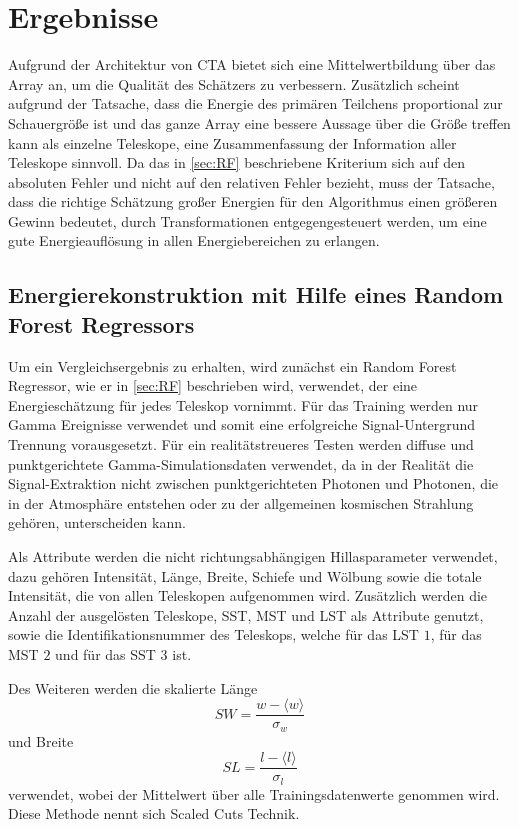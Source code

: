 \chapter{Ergebnisse}
Aufgrund der Architektur von CTA bietet sich eine Mittelwertbildung über das Array an, um die Qualität des Schätzers zu verbessern.
Zusätzlich scheint aufgrund der Tatsache, dass die Energie des primären Teilchens proportional zur Schauergröße ist und das
ganze Array eine bessere Aussage über die Größe treffen kann als einzelne Teleskope, eine Zusammenfassung der
Information aller Teleskope sinnvoll.
Da das in \autoref{sec:RF} beschriebene Kriterium sich auf den absoluten Fehler und nicht auf den relativen Fehler
bezieht, muss der Tatsache, dass die richtige Schätzung großer Energien für den Algorithmus einen größeren Gewinn bedeutet,
durch Transformationen entgegengesteuert werden, um eine gute Energieauflösung in allen Energiebereichen zu erlangen.

\section{Energierekonstruktion mit Hilfe eines Random Forest Regressors}
\label{sec:first}

Um ein Vergleichsergebnis zu erhalten, wird zunächst ein Random Forest Regressor, wie er in \autoref{sec:RF} beschrieben wird, verwendet,
der eine Energieschätzung für jedes Teleskop vornimmt.
Für das Training werden nur Gamma Ereignisse verwendet und somit eine erfolgreiche Signal-Untergrund Trennung vorausgesetzt.
Für ein realitätstreueres Testen werden diffuse und punktgerichtete Gamma-Simulationsdaten verwendet, da in der
Realität die Signal-Extraktion nicht zwischen punktgerichteten Photonen und Photonen, die in der Atmosphäre entstehen oder zu der
allgemeinen kosmischen Strahlung gehören, unterscheiden kann.

Als Attribute werden die nicht richtungsabhängigen Hillasparameter verwendet, dazu gehören Intensität, Länge, Breite, Schiefe und Wölbung sowie
die totale Intensität, die von allen Teleskopen aufgenommen wird.
Zusätzlich werden die Anzahl der ausgelösten Teleskope, SST, MST und LST als Attribute genutzt, sowie die Identifikationsnummer des
Teleskops, welche für das LST $1$, für das MST $2$ und für das SST $3$ ist.

Des Weiteren werden die skalierte Länge
\begin{equation}
  SW = \frac{w- \langle w \rangle}{\sigma_w}
\end{equation}
und Breite
\begin{equation}
  SL = \frac{l - \langle l \rangle}{\sigma_l}
\end{equation}
verwendet, wobei der Mittelwert über alle Trainingsdatenwerte genommen wird. Diese Methode nennt sich Scaled Cuts Technik.~\cite[104]{HESS}

